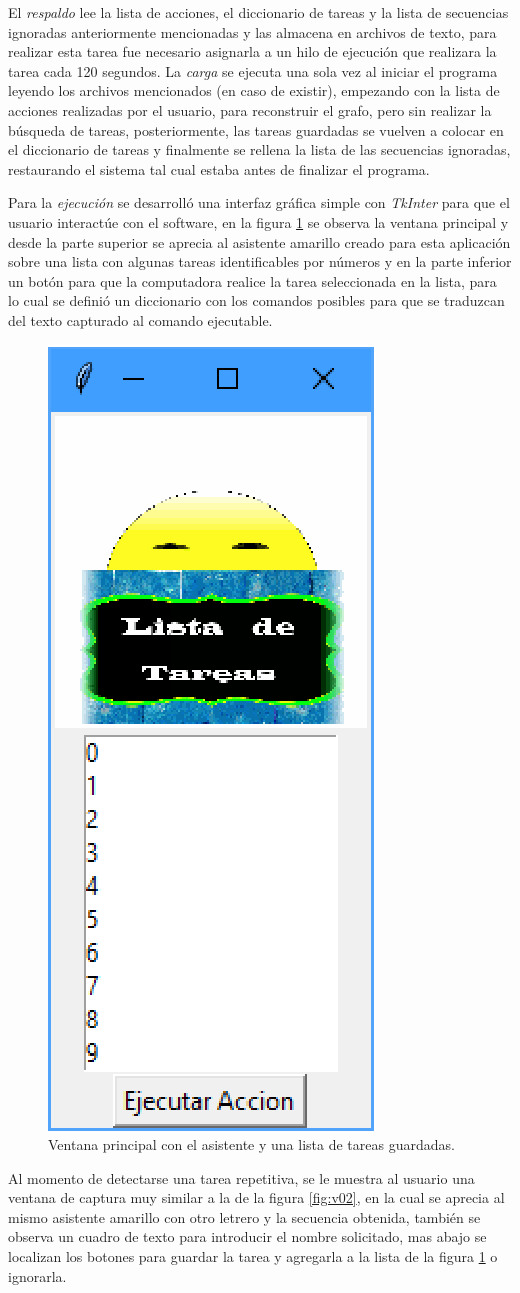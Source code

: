 El \emph{respaldo} lee la lista de acciones, el diccionario de tareas y la lista de secuencias ignoradas anteriormente mencionadas y las almacena en archivos de texto, para realizar esta tarea fue necesario asignarla a un hilo de ejecuci\'on que realizara la tarea cada 120 segundos. La \emph{carga} se ejecuta una sola vez al iniciar el programa leyendo los archivos mencionados (en caso de existir), empezando con la lista de acciones realizadas por el usuario, para reconstruir el grafo, pero sin realizar la b\'usqueda de tareas, posteriormente, las tareas guardadas se vuelven a colocar en el diccionario de tareas y finalmente se rellena la lista de las secuencias ignoradas, restaurando el sistema tal cual estaba antes de finalizar el programa.


Para la \emph{ejecuci\'on} se desarroll\'o una interfaz gr\'afica simple con \emph{TkInter} para que el usuario interact\'ue con el software, en la figura \ref{fig:v01} se observa la ventana principal y desde la parte superior se aprecia al asistente amarillo creado para esta aplicaci\'on sobre una lista con algunas tareas identificables por n\'umeros y en la parte inferior un bot\'on para que la computadora realice la tarea seleccionada en la lista, para lo cual se defini\'o un diccionario con los comandos posibles para que se traduzcan del texto capturado al comando ejecutable. 


\begin{figure}[H]
\centering
\includegraphics[width=0.2\columnwidth]{chap4/Imagenes/ventana1.eps}
\caption{Ventana principal con el asistente y una lista de tareas guardadas.}
\label{fig:v01}
\end{figure} 

Al momento de detectarse una tarea repetitiva, se le muestra al usuario una ventana de captura muy similar a la de la figura \ref{fig:v02}, en la cual se aprecia al mismo asistente amarillo con otro letrero y la secuencia obtenida, tambi\'en se observa un cuadro de texto para introducir el nombre solicitado, mas abajo se localizan los botones para guardar la tarea y agregarla a la lista de la figura \ref{fig:v01} o ignorarla.


